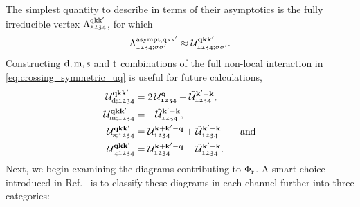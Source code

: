 \documentclass[../../main.tex]{subfiles}
\begin{document}
The simplest quantity to describe in terms of their asymptotics is the fully irreducible vertex $\Lambda^{\text{q}\text{k}\text{k}'}_{\mathfrak{1234}}$, for which
\begin{align}
	\Lambda^{\text{asympt};\text{q}\text{k}\text{k}'}_{\mathfrak{1234};\sigma\sigma'}\approx\mathcal{U}^{\textbf{qkk}'}_{\mathfrak{1234};\sigma\sigma'}.
\end{align}
Constructing $\text{d},\text{m},\text{s}$ and $\text{t}$ combinations of the full non-local interaction in \eqref{eq:crossing_symmetric_uq} is useful for future calculations,
\begin{subequations}
\begin{align}
	\mathcal{U}^{\textbf{qkk}'}_{\text{d};\mathfrak{1234}}&=2\,\mathcal{U}^{\textbf{q}}_{\mathfrak{1234}} - \tilde{\mathcal{U}}^{\textbf{k}'-\textbf{k}}_{\mathfrak{1234}},\\
	\mathcal{U}^{\textbf{qkk}'}_{\text{m};\mathfrak{1234}}&=-\tilde{\mathcal{U}}^{\textbf{k}'-\textbf{k}}_{\mathfrak{1234}},\\
	\mathcal{U}^{\textbf{qkk}'}_{\text{s};\mathfrak{1234}}&=\mathcal{U}^{\textbf{k}+\textbf{k}'-\textbf{q}}_{\mathfrak{1234}}+\tilde{\mathcal{U}}^{\textbf{k}'-\textbf{k}}_{\mathfrak{1234}}\qquad\text{and}\\
	\mathcal{U}^{\textbf{qkk}'}_{\text{t};\mathfrak{1234}}&=\mathcal{U}^{\textbf{k}+\textbf{k}'-\textbf{q}}_{\mathfrak{1234}}-\tilde{\mathcal{U}}^{\textbf{k}'-\textbf{k}}_{\mathfrak{1234}}.
\end{align}
\end{subequations}
Next, we begin examining the diagrams contributing to $\Phi_{\text{r}}$. A smart choice introduced in Ref.~\cite{Wentzell2020} is to classify these diagrams in each channel further into three categories:
\end{document}
